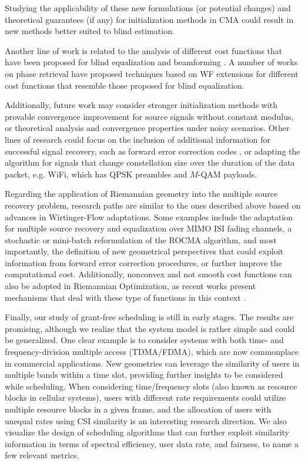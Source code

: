Studying the applicability of these new formulations (or potential changes) and theoretical guarantees (if any) for initialization methods in CMA could result in new methods better suited to blind estimation.

Another line of work is related to the analysis of different cost functions that have been proposed for blind equalization and beamforming \cite{Benveniste1980bgr,Sato1975,Shalvi1990}. A number of works on phase retrieval have proposed techniques based on WF extensions for different cost functions \cite{Zhang2016mediantruncatedwf,Cai2016thresholdedwf,Lazreg2018optimasparselrobustwf} that resemble those proposed for blind equalization.

Additionally, future work may consider stronger initialization methods with provable convergence improvement for source signals without constant modulus, or theoretical analysis and convergence properties under noisy scenarios. 
Other lines of research could focus on the inclusion of additional information for successful signal recovery, such as forward error correction codes \cite{Jalali2020}, or adapting the algorithm for signals that change constellation size over the duration of the data packet, e.g. WiFi, which has QPSK preambles and $M$-QAM payloads. 


Regarding the application of Riemannian geometry into the multiple source recovery problem, research paths are similar to the ones described above based on advances in Wirtinger-Flow adaptations. Some examples include the adaptation for multiple source recovery and equalization over MIMO ISI fading channels, a stochastic or mini-batch reformulation of the ROCMA algorithm, and most importantly, the definition of new geometrical perspectives that could exploit information from forward error correction procedures, or further improve the computational cost.
Additionally, nonconvex and not smooth cost functions can also be adopted in Riemannian Optimization, as recent works present mechanisms that deal with these type of functions in this context \cite{Kovnatsky2016madmmriemann,Absil2019nonsmoothriemannian}. 


Finally, our study of grant-free scheduling is still in early stages. The results are promising, although we realize that the system model is rather simple and could be generalized. One clear example is to consider systems with both time- and frequency-division multiple access (TDMA/FDMA), which are now commonplace in commercial applications. New geometries can leverage the similarity of users in multiple bands within a time slot, providing further insights to be considered while scheduling. When considering time/frequency slots (also known as resource blocks in cellular systems), users with different rate requirements could utilize multiple resource blocks in a given frame, and the allocation of users with unequal rates using CSI similarity is an interesting research direction. We also visualize the design of scheduling algorithms that can further exploit similarity information in terms of spectral efficiency, user data rate, and fairness, to name a few relevant metrics.


